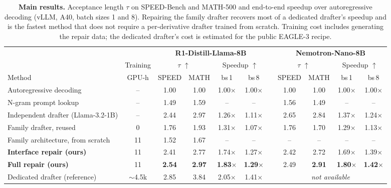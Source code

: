 \documentclass[11pt]{article}
\newcommand{\tauacc}{\tau}
\begin{document}
\begin{table}[t]
  \centering
  \small
  \setlength{\tabcolsep}{4.6pt}
  \begin{tabular}{@{}l c cccc c cccc@{}}
    \toprule
    & & \multicolumn{4}{c}{\textbf{R1-Distill-Llama-8B}} & & \multicolumn{4}{c}{\textbf{Nemotron-Nano-8B}} \\
    \cmidrule(lr){3-6} \cmidrule(lr){8-11}
    & Training & \multicolumn{2}{c}{$\tauacc$ $\uparrow$} & \multicolumn{2}{c}{Speedup $\uparrow$} & & \multicolumn{2}{c}{$\tauacc$ $\uparrow$} & \multicolumn{2}{c}{Speedup $\uparrow$} \\
    \cmidrule(lr){3-4} \cmidrule(lr){5-6} \cmidrule(lr){8-9} \cmidrule(lr){10-11}
    Method & GPU-h & SPEED & MATH & bs\,1 & bs\,8 & & SPEED & MATH & bs\,1 & bs\,8 \\
    \midrule
    Autoregressive decoding & -- & 1.00 & 1.00 & 1.00$\times$ & 1.00$\times$ & & 1.00 & 1.00 & 1.00$\times$ & 1.00$\times$ \\
    N-gram prompt lookup & -- & 1.49 & 1.59 & -- & -- & & 1.56 & 1.49 & -- & -- \\ %
    Independent drafter (Llama-3.2-1B) & -- & 2.44 & 2.97 & 1.26$\times$ & 1.11$\times$ & & 2.65 & 2.84 & 1.37$\times$ & 1.24$\times$ \\ %
    Family drafter, reused & 0 & 1.76 & 1.93 & 1.31$\times$ & 1.07$\times$ & & 1.76 & 1.70 & 1.29$\times$ & 1.13$\times$ \\
    Family architecture, from scratch & 11 & 1.52 & 1.67 & -- & -- & & -- & -- & -- & -- \\ %
    \midrule
    \textbf{Interface repair (ours)} & 11 & 2.41 & 2.77 & 1.74$\times$ & 1.27$\times$ & & 2.42 & 2.72 & 1.69$\times$ & 1.39$\times$ \\
    \textbf{Full repair (ours)} & 11 & \textbf{2.54} & \textbf{2.97} & \textbf{1.83$\times$} & \textbf{1.29$\times$} & & 2.49 & \textbf{2.91} & \textbf{1.80$\times$} & \textbf{1.42$\times$} \\ %
    \midrule
    \textcolor{black!60}{Dedicated drafter (reference)} & \textcolor{black!60}{${\sim}$4.5k} & \textcolor{black!60}{2.85} & \textcolor{black!60}{3.84} & \textcolor{black!60}{2.05$\times$} & \textcolor{black!60}{1.41$\times$} & & \multicolumn{4}{c}{\textcolor{black!60}{\emph{not available}}} \\
    \bottomrule
  \end{tabular}
  \caption{\textbf{Main results.} Acceptance length $\tauacc$ on SPEED-Bench and MATH-500 and end-to-end speedup over autoregressive decoding (vLLM, A40, batch sizes 1 and 8). Repairing the family drafter recovers most of a dedicated drafter's speedup and is the fastest method that does not require a per-derivative drafter trained from scratch. Training cost includes generating the repair data; the dedicated drafter's cost is estimated for the public EAGLE-3 recipe.}
  \label{tab:main}
\end{table}
\end{document}
